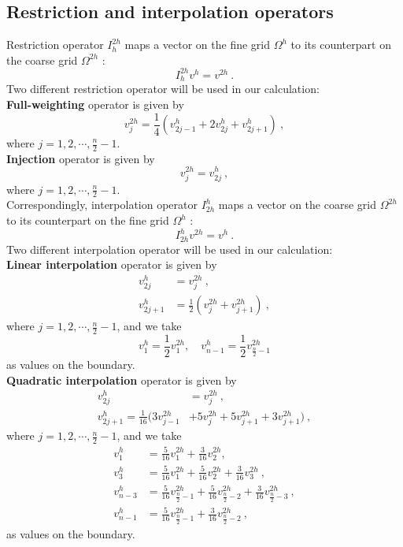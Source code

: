 \documentclass[a4paper,twocolumn]{article}
\theoremstyle{definition}
\begin{document}
\subsection{Restriction and interpolation operators}
Restriction operator $I_h^{2h}$ maps a vector on the fine grid $\Omega^h$ to its counterpart on the coarse grid $\Omega^{2h}$ :
$$
I_{h}^{2 h} v^{h}=v^{2 h} \ .
$$
Two different restriction operator will be used in our calculation:\\
\textbf{Full-weighting} operator is given by
$$
v_{j}^{2 h}=\frac{1}{4}\left(v_{2 j-1}^{h}+2 v_{2 j}^{h}+v_{2 j+1}^{h}\right) \ ,
$$
where $j = 1,2,\cdots,\frac{n}{2} - 1.$\\
\textbf{Injection} operator is given by
$$
v_{j}^{2 h}=v_{2 j}^{h} \ ,
$$
where $j = 1,2,\cdots,\frac{n}{2} - 1.$\\
Correspondingly, interpolation operator $I_{2h}^{h}$ maps a vector on the coarse grid $\Omega^{2h}$ to its counterpart on the fine grid $\Omega^h$   :
$$
I_{2 h}^{h} v^{2h}=v^{h} \ .
$$
\newpage
\noindent Two different interpolation operator will be used in our calculation:\\
\textbf{Linear interpolation} operator is given by
$$
\begin{aligned}
v_{2 j}^{h} &=v_{j}^{2 h} \ , \\
v_{2 j+1}^{h} &=\frac{1}{2}\left(v_{j}^{2 h}+v_{j+1}^{2 h}\right) \ ,
\end{aligned}
$$
where $j = 1,2,\cdots,\frac{n}{2} - 1$, and we take
$$
v_{1}^{h} = \frac{1}{2}v_{1}^{2h},\quad v_{n-1}^{h} = \frac{1}{2}v_{\frac{n}{2} - 1}^{2h}
$$
as values on the boundary.\\
\textbf{Quadratic interpolation} operator is given by
$$
\begin{aligned}
v_{2 j}^{h} &=v_{j}^{2 h} \ , \\
v_{2 j+1}^{h} =\frac{1}{16}(3v_{j-1}^{2h} & +5v_{j}^{2 h}  +5v_{j+1}^{2 h}+3v_{j+1}^{2h} ) \ ,
\end{aligned}
$$
where $j = 1,2,\cdots,\frac{n}{2} - 1$, and we take
$$
\begin{aligned}
v_{1}^{h} &= \frac{5}{16}v_{1}^{2h}+\frac{3}{16}v_{2}^{2h}, \\ v_{3}^{h} &= \frac{5}{16}v_{1}^{2h}+\frac{5}{16}v_{2}^{2h}+\frac{3}{16}v_{3}^{2h} \ ,\\
v_{n-3}^{h} &=\frac{5}{16}v_{\frac{n}{2} - 1}^{2h}+\frac{5}{16}v_{\frac{n}{2} - 2}^{2h}+\frac{3}{16}v_{\frac{n}{2} - 3}^{2h} \ ,\\
v_{n-1}^{h} &=\frac{5}{16}v_{\frac{n}{2} - 1}^{2h}+\frac{3}{16}v_{\frac{n}{2} - 2}^{2h} \ ,
\end{aligned}
$$
as values on the boundary.\\
\end{document}
